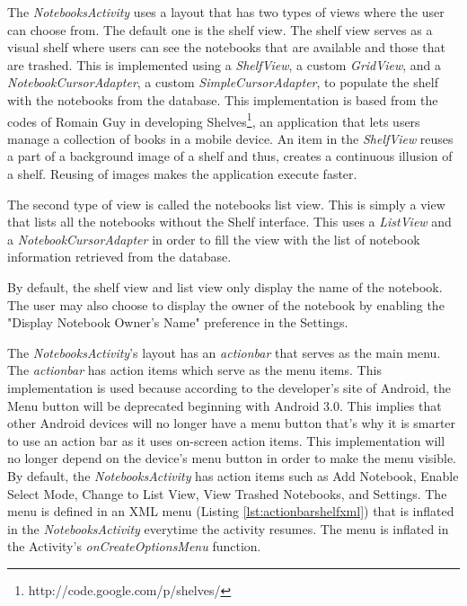 \begin{raggedright}
The \textit{NotebooksActivity} uses a layout that has two types of views where the user can choose from. The default one is the shelf view. The shelf view serves as a visual shelf where users can see the notebooks that are available and those that are trashed. This is implemented using a \textit{ShelfView}, a custom \textit{GridView}, and a \textit{NotebookCursorAdapter}, a custom \textit{SimpleCursorAdapter}, to populate the shelf with the notebooks from the database. This implementation is based from the codes of Romain Guy in developing Shelves\footnote[5]{http://code.google.com/p/shelves/}, an application that lets users manage a collection of books in a mobile device. An item in the \textit{ShelfView} reuses a part of a background image of a shelf and thus, creates a continuous illusion of a shelf. Reusing of images makes the application execute faster.
\end{raggedright}

The second type of view is called the notebooks list view. This is simply a view that lists all the notebooks without the Shelf interface. This uses a \textit{ListView} and a \textit{NotebookCursorAdapter} in order to fill the view with the list of notebook information retrieved from the database. 

By default, the shelf view and list view only display the name of the notebook. The user may also choose to display the owner of the notebook by enabling the "Display Notebook Owner's Name" preference in the Settings.

The \textit{NotebooksActivity}'s layout has an \textit{actionbar} that serves as the main menu. The \textit{actionbar} has action items which serve as the menu items. This implementation is used because according to the developer's site of Android, the Menu button will be deprecated beginning with Android 3.0. This implies that other Android devices will no longer have a menu button that's why it is smarter to use an action bar as it uses on-screen action items. This implementation will no longer depend on the device's menu button in order to make the menu visible. By default, the \textit{NotebooksActivity} has action items such as Add Notebook, Enable Select Mode, Change to List View, View Trashed Notebooks, and Settings. The menu is defined in an XML menu (Listing \ref{lst:actionbarshelfxml}) that is inflated in the \textit{NotebooksActivity} everytime the activity resumes. The menu is inflated in the Activity's \textit{onCreateOptionsMenu} function. 

